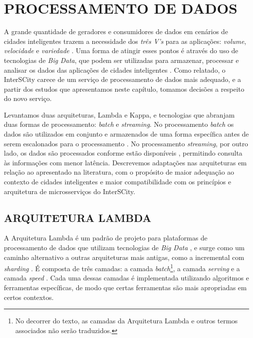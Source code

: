 \chapter[PROCESSAMENTO DE DADOS]{PROCESSAMENTO DE DADOS}
\label{chapter:data}

A grande quantidade de geradores e consumidores de dados em cenários de cidades
inteligentes trazem a necessidade dos \textit{três V's} para as aplicações:
\textit{volume}, \textit{velocidade} e \textit{variedade} \cite{alnuaimi2015}.
Uma forma de atingir esses pontos é através do uso de tecnologias de
\textit{Big Data}, que podem ser utilizadas para armazenar, processar e analisar
os dados das aplicações de cidades inteligentes \cite{alnuaimi2015}. Como
relatado, o InterSCity carece de um serviço de processamento de dados mais
adequado, e a partir dos estudos que apresentamos neste capítulo, tomamos
decisões a respeito do novo serviço.

Levantamos duas arquiteturas, Lambda e Kappa, e tecnologias que abranjam duas
formas de processamento: \textit{batch} e
\textit{streaming}. No processamento \textit{batch} os dados são utilizados
em conjunto e armazenados de uma forma específica antes de serem escalonados
para o processamento \cite{zheng2015real}. No processamento
\textit{streaming}, por outro lado, os dados são processados conforme estão
disponíveis \cite{zheng2015real}, permitindo consulta às informações com menor
latência. Descrevemos adaptações nas arquiteturas em relação ao apresentado
na literatura, com o propósito de maior adequação ao contexto de cidades
inteligentes e maior compatibilidade com os princípios e arquitetura de
microsserviços do InterSCity.

\section{ARQUITETURA LAMBDA}

A Arquitetura Lambda é um padrão de projeto para plataformas de processamento
de dados que utilizam tecnologias de \textit{Big Data} \cite{kiran2015}, e
surge como um caminho alternativo a outras arquiteturas mais antigas, como a
incremental com \textit{sharding} \cite{marz2015}. É composta de três camadas:
a camada \textit{batch}\footnote{No decorrer do texto, as camadas da
Arquitetura Lambda e outros termos associados não serão traduzidos.}, a camada
\textit{serving} e a camada \textit{speed} \cite{kiran2015}. Cada uma dessas
camadas é implementada utilizando algoritmos e ferramentas específicas, de modo
que certas ferramentas são mais apropriadas em certos contextos.

